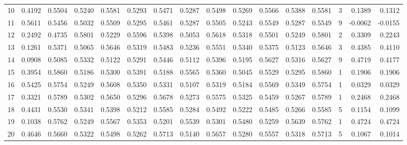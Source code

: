 \begin{tabular}{lrrrrrrrrrrrrrrr}
10  &      0.4192 &  0.5504 &  0.5240 &  0.5581 &  0.5293 &  0.5471 &  0.5287 &  0.5498 &  0.5269 &  0.5566 &   0.5388 &     0.5581 &      3 &                    0.1389 &                     0.1312 \\
11  &      0.5611 &  0.5456 &  0.5032 &  0.5509 &  0.5295 &  0.5461 &  0.5287 &  0.5505 &  0.5243 &  0.5549 &   0.5287 &     0.5549 &      9 &                   -0.0062 &                    -0.0155 \\
12  &      0.2492 &  0.4735 &  0.5801 &  0.5229 &  0.5596 &  0.5398 &  0.5053 &  0.5618 &  0.5318 &  0.5501 &   0.5249 &     0.5801 &      2 &                    0.3309 &                     0.2243 \\
13  &      0.1261 &  0.5371 &  0.5065 &  0.5646 &  0.5319 &  0.5483 &  0.5236 &  0.5551 &  0.5340 &  0.5375 &   0.5123 &     0.5646 &      3 &                    0.4385 &                     0.4110 \\
14  &      0.0908 &  0.5085 &  0.5332 &  0.5122 &  0.5291 &  0.5446 &  0.5112 &  0.5396 &  0.5195 &  0.5627 &   0.5316 &     0.5627 &      9 &                    0.4719 &                     0.4177 \\
15  &      0.3954 &  0.5860 &  0.5186 &  0.5300 &  0.5391 &  0.5188 &  0.5565 &  0.5360 &  0.5045 &  0.5529 &   0.5295 &     0.5860 &      1 &                    0.1906 &                     0.1906 \\
16  &      0.5425 &  0.5754 &  0.5249 &  0.5608 &  0.5350 &  0.5331 &  0.5107 &  0.5319 &  0.5184 &  0.5569 &   0.5349 &     0.5754 &      1 &                    0.0329 &                     0.0329 \\
17  &      0.3321 &  0.5789 &  0.5302 &  0.5650 &  0.5296 &  0.5678 &  0.5273 &  0.5575 &  0.5325 &  0.5459 &   0.5267 &     0.5789 &      1 &                    0.2468 &                     0.2468 \\
18  &      0.4431 &  0.5530 &  0.5341 &  0.5398 &  0.5212 &  0.5585 &  0.5284 &  0.5492 &  0.5222 &  0.5485 &   0.5266 &     0.5585 &      5 &                    0.1154 &                     0.1099 \\
19  &      0.1038 &  0.5762 &  0.5249 &  0.5567 &  0.5353 &  0.5201 &  0.5539 &  0.5301 &  0.5480 &  0.5259 &   0.5639 &     0.5762 &      1 &                    0.4724 &                     0.4724 \\
20  &      0.4646 &  0.5660 &  0.5322 &  0.5498 &  0.5262 &  0.5713 &  0.5140 &  0.5657 &  0.5280 &  0.5557 &   0.5318 &     0.5713 &      5 &                    0.1067 &                     0.1014 \\

\end{tabular}
